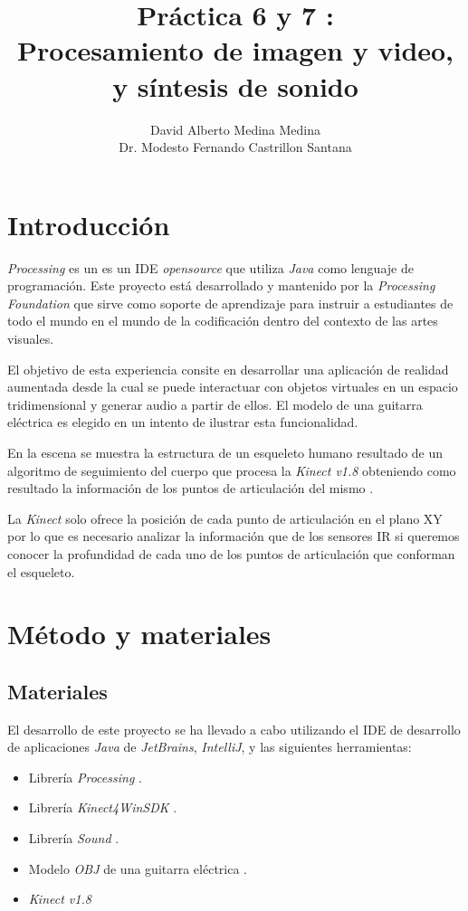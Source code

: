 \documentclass[10pt,a4paper]{report}
\author{David Alberto Medina Medina
	\\
	Dr. Modesto Fernando Castrillon Santana}
\title{Práctica 6 y 7 :\\ Procesamiento de imagen y video, \\y síntesis de sonido}
\begin{document}
	\maketitle
	\tableofcontents
	
	\chapter{Introducción}
	\textit{Processing} es un es un IDE \textit{opensource} que utiliza \textit{Java} como lenguaje de programación. Este proyecto está desarrollado y mantenido por la \textit{Processing Foundation} que sirve como soporte de aprendizaje para instruir a estudiantes de todo el mundo en el mundo de la codificación dentro del contexto de las artes visuales.
	
	El objetivo de esta experiencia consite en desarrollar una aplicación de realidad aumentada desde la cual se puede interactuar con objetos virtuales en un espacio tridimensional y generar audio a partir de ellos. El modelo de una guitarra eléctrica es elegido en un intento de ilustrar esta funcionalidad. 
	
	En la escena se muestra la estructura de un esqueleto humano resultado de un algoritmo de seguimiento del cuerpo que procesa la \textit{Kinect v1.8} obteniendo como resultado la información de los puntos de articulación del mismo \cite{kinect-controller}. 
	
	La \textit{Kinect} solo ofrece la posición de cada punto de articulación en el plano XY por lo que es necesario analizar la información que de los sensores IR si queremos conocer la profundidad de cada uno de los puntos de articulación que conforman el esqueleto.
	
	\chapter{Método y materiales}
	\section{Materiales}
	El desarrollo de este proyecto se ha llevado a cabo utilizando el IDE de desarrollo de aplicaciones \textit{Java} de \textit{JetBrains}, \textit{IntelliJ}, y las siguientes herramientas:
	\begin{itemize}
		\item Librería \textit{Processing} \cite{processing-javadoc}.
		\item Librería \textit{Kinect4WinSDK} \cite{kinect4winsdk}.
		\item Librería \textit{Sound} \cite{sound-library}.
		\item Modelo \textit{OBJ} de una guitarra eléctrica \cite{3d-guitar-model}.
		\item \textit{Kinect v1.8} \cite{kinect-sdk}
	\end{itemize}
	
\end{document}
